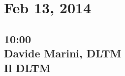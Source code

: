 \documentclass[a4paper,twoside,notitlepage]{article}
\begin{document}
%  

\title{}
\author{Chiara P. Montagna}
\date{\today}
\maketitle

\section{Feb 13, 2014}
\subsection{10:00 \\ Davide Marini, DLTM \\ Il DLTM}


% 
\end{document}
